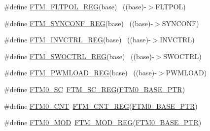 \begin{DoxyCompactItemize}
\item 
\#define \hyperlink{group___f_t_m___register___accessor___macros_ga031ade84211f87bed77fb3b71dfa67e6}{F\+T\+M\+\_\+\+F\+L\+T\+P\+O\+L\+\_\+\+R\+EG}(base)                                      ~((base)-\/$>$F\+L\+T\+P\+OL)
\item 
\#define \hyperlink{group___f_t_m___register___accessor___macros_gab945eb614e7150c2e0048fb7b684ebad}{F\+T\+M\+\_\+\+S\+Y\+N\+C\+O\+N\+F\+\_\+\+R\+EG}(base)                                    ~((base)-\/$>$S\+Y\+N\+C\+O\+NF)
\item 
\#define \hyperlink{group___f_t_m___register___accessor___macros_gaa802450fbaa2dc424ffe4838d5c9a89b}{F\+T\+M\+\_\+\+I\+N\+V\+C\+T\+R\+L\+\_\+\+R\+EG}(base)                                    ~((base)-\/$>$I\+N\+V\+C\+T\+RL)
\item 
\#define \hyperlink{group___f_t_m___register___accessor___macros_ga9d8f5821b8f521665946f61a878a3963}{F\+T\+M\+\_\+\+S\+W\+O\+C\+T\+R\+L\+\_\+\+R\+EG}(base)                                    ~((base)-\/$>$S\+W\+O\+C\+T\+RL)
\item 
\#define \hyperlink{group___f_t_m___register___accessor___macros_ga2788d558fe351bdcafa92b44f8611c03}{F\+T\+M\+\_\+\+P\+W\+M\+L\+O\+A\+D\+\_\+\+R\+EG}(base)                                    ~((base)-\/$>$P\+W\+M\+L\+O\+AD)
\item 
\#define \hyperlink{group___f_t_m___register___accessor___macros_gaa8cb4b7bcccc202d9256a35e2557c359}{F\+T\+M0\+\_\+\+SC}~\hyperlink{group___f_t_m___register___accessor___macros_ga0b48df6cbccecf754cc49bb7ea1e3aad}{F\+T\+M\+\_\+\+S\+C\+\_\+\+R\+EG}(\hyperlink{group___f_t_m___peripheral_gae712c29b7abcf338d8f8f6418683fa66}{F\+T\+M0\+\_\+\+B\+A\+S\+E\+\_\+\+P\+TR})
\item 
\#define \hyperlink{group___f_t_m___register___accessor___macros_ga8049141666e13721ffe63b8211198740}{F\+T\+M0\+\_\+\+C\+NT}~\hyperlink{group___f_t_m___register___accessor___macros_ga1ba1654f76ecc24de48047117cb5b45e}{F\+T\+M\+\_\+\+C\+N\+T\+\_\+\+R\+EG}(\hyperlink{group___f_t_m___peripheral_gae712c29b7abcf338d8f8f6418683fa66}{F\+T\+M0\+\_\+\+B\+A\+S\+E\+\_\+\+P\+TR})
\item 
\#define \hyperlink{group___f_t_m___register___accessor___macros_ga56f8edd0307e766bdde08dbd8cb616c7}{F\+T\+M0\+\_\+\+M\+OD}~\hyperlink{group___f_t_m___register___accessor___macros_gabbea5752afc54317fcb50890f8593a49}{F\+T\+M\+\_\+\+M\+O\+D\+\_\+\+R\+EG}(\hyperlink{group___f_t_m___peripheral_gae712c29b7abcf338d8f8f6418683fa66}{F\+T\+M0\+\_\+\+B\+A\+S\+E\+\_\+\+P\+TR})
\item 

\end{DoxyCompactItemize}

